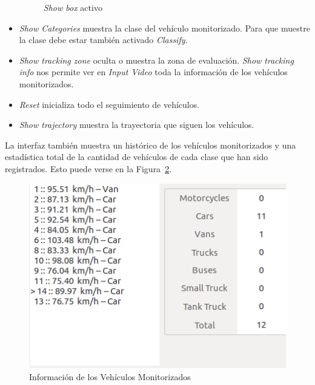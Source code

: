 \begin{itemize}
\begin{figure}[H]
\begin{center}
       \caption{\textit{Show box} activo}
    	\label{fig.show_box}
    \end{center}
    \end{figure}
    \item \textit{Show Categories} muestra la clase del vehículo monitorizado. Para que muestre la clase debe estar también activado \textit{Classify}.
    \item \textit{Show tracking zone} oculta o muestra la zona de evaluación.
    \textit{Show tracking info} nos permite ver en \textit{Input Video} toda la información de los vehículos monitorizados.
    \item \textit{Reset} inicializa todo el seguimiento de vehículos.
    \item \textit{Show trajectory} muestra la trayectoria que siguen los vehículos.
\end{itemize}

La interfaz también muestra un histórico de los vehículos monitorizados y una estadística total de la cantidad de vehículos de cada clase que han sido registrados. Esto puede verse en la Figura~\ref{fig.info_vehicles}.


    \begin{figure}[H] 
    \begin{center}
    	\includegraphics[scale=0.6]{figures/Diseno_global/info.png}
       \caption{Información de los Vehículos Monitorizados}
    	\label{fig.info_vehicles}
    \end{center}
    \end{figure}
    


